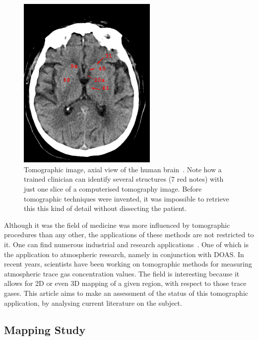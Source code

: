 \begin{figure}[htb]
    \centering
    \includegraphics[width=0.6\textwidth]{img/CT07.jpg}    
    \caption{Tomographic image, axial view of the human
        brain~\cite{Glowniak}. Note how a trained clinician can identify
        several structures (7 red notes) with just one slice of a
        computerised tomography image. Before tomographic techniques
        were invented, it was impossible to retrieve this this kind of
        detail without dissecting the patient.}
    \label{fig:ct_scan}
\end{figure}

Although it was the field of medicine was more influenced by tomographic
procedures than any other, the applications of these methods are not
restricted to it. One can find numerous industrial and research
applications~\cite{Wang2015, Haisch2012, Byer1979}. One of which is the
application to atmospheric research, namely in conjunction with DOAS. In
recent years, scientists have been working on tomographic methods for
measuring atmospheric trace gas concentration values. The field is
interesting because it allows for 2D or even 3D mapping of a given
region, with respect to those trace gases. This article aims to make an
assessment of the status of this tomographic application, by analysing
current literature on the subject. 



\subsection{Mapping Study}
\label{sub:mapping_study}

